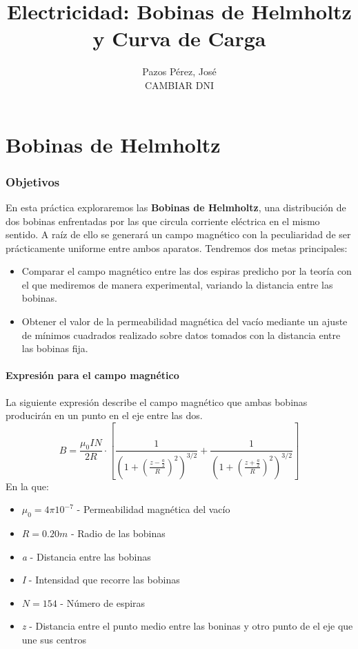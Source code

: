 \documentclass[12pt, a4paper, titlepage]{article}
\title{\textbf {Electricidad: Bobinas de Helmholtz y Curva de Carga}}
\author{{\Large Pazos Pérez, José}\\CAMBIAR DNI}
\date{}
\begin{document}
  \maketitle

  \tableofcontents

  \newpage
  \part{Bobinas de Helmholtz}

  \section{Objetivos}

  En esta práctica exploraremos las \textbf{Bobinas de Helmholtz}, una distribución de dos bobinas enfrentadas por las que circula corriente eléctrica en el mismo sentido. A raíz de ello se generará un campo magnético con la peculiaridad de ser prácticamente uniforme entre ambos aparatos. Tendremos dos metas principales:

  \begin{itemize}[label=$-$]
    \item Comparar el campo magnético entre las dos espiras predicho por la teoría con el que mediremos de manera experimental, variando la distancia entre las bobinas.
    \item Obtener el valor de la permeabilidad magnética del vacío mediante un ajuste de mínimos cuadrados realizado sobre datos tomados con la distancia entre las bobinas fija.
  \end{itemize}

  \subsection{Expresión para el campo magnético}

  La siguiente expresión describe el campo magnético que ambas bobinas producirán en un punto en el eje entre las dos.
  \begin{equation}
    B = \frac{\mu_0 I N}{2R} \cdot \left[\frac{1}{\left(1 + \left(\frac{z - \frac{a}{2}}{R}\right)^2 \right)^{3/2}} + \frac{1}{\left(1 + \left(\frac{z + \frac{a}{2}}{R}\right)^2 \right)^{3/2}}\right]
    \label{ec:B}
  \end{equation}
  En la que:
  \begin{itemize}[label=$-$]
    \item $\mu_0 = 4 \pi 10^{-7}$ - Permeabilidad magnética del vacío
    \item $R = 0.20m$ - Radio de las bobinas
    \item \textit{a} - Distancia entre las bobinas
    \item \textit{I} - Intensidad que recorre las bobinas
    \item $N = 154$ - Número de espiras
    \item \textit{z} - Distancia entre el punto medio entre las boninas y otro punto de el eje que une sus centros
  \end{itemize}
\end{document}
